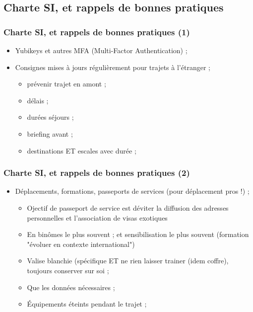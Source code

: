 \documentclass[slidetop,11pt]{beamer}
\begin{document}
\subsection{Charte SI, et rappels de bonnes pratiques}
\begin{frame}
	\frametitle{Charte SI, et rappels de bonnes pratiques (1)}
	\begin{itemize}
		\item Yubikeys et autres MFA (Multi-Factor Authentication) ; 
		\item Consignes mises {\`a} jours r{\'e}guli{\`e}rement pour trajets {\`a} l'{\'e}tranger ; 
		\begin{itemize}
			\item pr{\'e}venir trajet en amont ; 
			\item d{\'e}lais ; 
			\item dur{\'e}es s{\'e}jours ; 
			\item briefing avant ; 
			\item destinations ET escales avec dur{\'e}e ; 
		\end{itemize}
	\end{itemize}
\end{frame}

\begin{frame}
	\frametitle{Charte SI, et rappels de bonnes pratiques (2)}
	\begin{itemize}
		\item D{\'e}placements, formations, passeports de services (pour d{\'e}placement pros !) ; 
		\begin{itemize}
			\item Ojectif de passeport de service est d{\'e}viter la diffusion des adresses personnelles et l'association de visas exotiques
			\item En bin{\^o}mes le plus souvent ; et sensibilisation le plus souvent (formation "{\'e}voluer en contexte international")
			\item Valise blanchie (sp{\'e}cifique ET ne rien laisser trainer (idem coffre), toujours conserver sur soi ;  
			\item Que les donn{\'e}es n{\'e}cessaires ; 
			\item {\'E}quipements {\'e}teints pendant le trajet ;
		\end{itemize}
	\end{itemize}
\end{frame}
\end{document}
